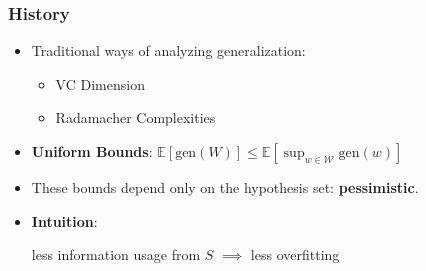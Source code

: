 \documentclass[usenames,dvipsnames, 10pt]{beamer}
\newcommand{\E}{\mathbb{E}}
\begin{document}
\begin{frame}
	\frametitle{History}
	
	\begin{itemize}
		\item Traditional ways of analyzing generalization:
		\begin{itemize}
			\item VC Dimension
			\item Radamacher Complexities
		\end{itemize}
		
		\pause
		
		\item \textbf{Uniform Bounds}: $\E[\mathrm{gen}(W)] \leq \E[\sup_{w\in\mathcal{W}} \mathrm{gen}(w)]$
	
	
		\pause
		
		\item These bounds depend only on the hypothesis set: \textbf{pessimistic}.
		
		\pause
				
		\item \textbf{Intuition}:
		\begin{center}
			less information usage from $S$ $\implies$ less overfitting
		\end{center}
		 	
	\end{itemize}
\end{frame}
\end{document}
